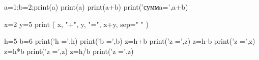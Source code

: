 a=1;b=2;print(a)
print(a)
print(a+b)
print('суммa=',a+b)

x=2
y=5
print ( x, "+", y, "=", x+y, sep=" " )

h=5
b=6
print('h =',h)
print('b =',b)
z=h+b
print('z =',z)
z=h-b
print('z =',z)
z=h*b
print('z =',z)
z=h/b
print('z =',z)
